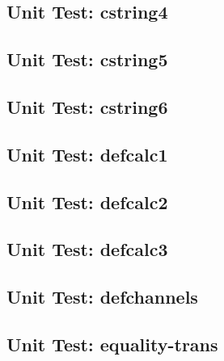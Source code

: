 \subsection*{Unit Test: cstring4}

 \clearpage
\subsection*{Unit Test: cstring5}

 \clearpage
\subsection*{Unit Test: cstring6}

 \clearpage
\subsection*{Unit Test: defcalc1}

 \clearpage
\subsection*{Unit Test: defcalc2}

 \clearpage
\subsection*{Unit Test: defcalc3}

 \clearpage
\subsection*{Unit Test: defchannels}

 \clearpage
\subsection*{Unit Test: equality-trans}

 \clearpage
